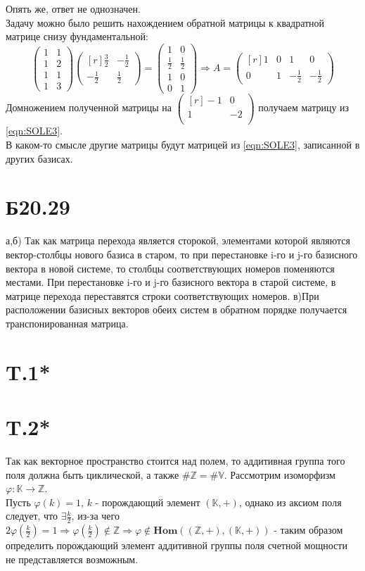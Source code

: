 Опять же, ответ не однозначен.\\
Задачу можно было решить нахождением обратной матрицы к квадратной матрице снизу фундаментальной:
$$\begin{pmatrix*}
1&1\\
1&2\\
1&1\\
1&3
\end{pmatrix*}{\begin{pmatrix*}[r]
\frac{3}{2}&-\frac{1}{2}\\
-\frac{1}{2}&\frac{1}{2}
\end{pmatrix*}}=\begin{pmatrix*}
1&0\\
\frac{1}{2}&\frac{1}{2}\\
1&0\\
0&1
\end{pmatrix*}\Rightarrow A=\begin{pmatrix*}[r]
1&0&1&0\\
0&1&-\frac{1}{2}&-\frac{1}{2}
\end{pmatrix*}$$
Домножением полученной матрицы на $\begin{pmatrix*}[r]
-1&0\\
1&-2\\
\end{pmatrix*}$
получаем матрицу из \eqref{eqn:SOLE3}. \\
В каком-то смысле другие матрицы будут матрицей из \eqref{eqn:SOLE3}, записанной в других базисах.
\section*{Б20.29}
а,б) Так как матрица перехода является сторокой, элементами которой являются вектор-столбцы нового базиса в старом, то  при перестановке i-го и j-го базисного вектора в новой системе, то столбцы соответствующих номеров поменяются местами. При перестановке i-го и j-го базисного вектора в старой системе, в матрице перехода переставятся строки соответствующих номеров.
в)При расположении базисных векторов обеих систем в обратном порядке получается транспонированная матрица.
\section*{T.1*}
\section*{T.2*}
Так как векторное пространство стоится над полем, то аддитивная группа того поля должна быть циклической, а также $\#\mathbb{Z}=\#\mathbb{V}$. Рассмотрим изоморфизм $\varphi:\mathbb{K}\to\mathbb{Z}$.\\
Пусть $\varphi(k)=1$, $k$ - порождающий элемент $(\mathbb{K},+)$, однако из аксиом поля следует, что $\exists \frac{k}{2}$, из-за чего $2\varphi\left(\frac{k}{2}\right)=1\Rightarrow\varphi\left(\frac{k}{2}\right)\not\in\mathbb{Z}\Rightarrow \varphi \not\in\mathbf{Hom}((\mathbb{Z},+),(\mathbb{K},+))$ - таким образом определить порождающий элемент аддитивной группы поля счетной мощности не представляется возможным. 
